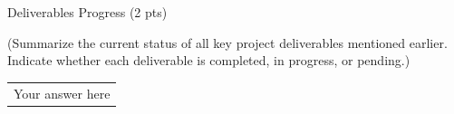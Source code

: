 \documentclass[12pt,a4paper]{article}
\newcommand{\sectiontitle}[1]{%
    {\color{GEUBlue}
    \fontsize{18}{22}\selectfont #1}
}
\newcommand{\instruction}[1]{%
    {\color{InstructionGrey}
    \fontsize{10.5}{13}\selectfont #1}
}
\newcommand{\answerbox}[2]{%
    \begin{tabularx}{\textwidth}{
        |>{\raggedright\arraybackslash}X|}
        \hline
        \parbox[t][#1][t]{\dimexpr\linewidth-12pt\relax}{
            \vspace{5pt}
            \fontsize{11}{13}\selectfont #2
        }\\
        \hline
    \end{tabularx}
}
\begin{document}
\vspace{0.65cm}

\sectiontitle{Deliverables Progress (2 pts)}

\vspace{0.05cm}

\instruction{
(Summarize the current status of all key project deliverables
mentioned earlier. Indicate whether each deliverable is completed,
in progress, or pending.)
}

\vspace{0.25cm}

\answerbox{3.20cm}{Your answer here}
\end{document}
